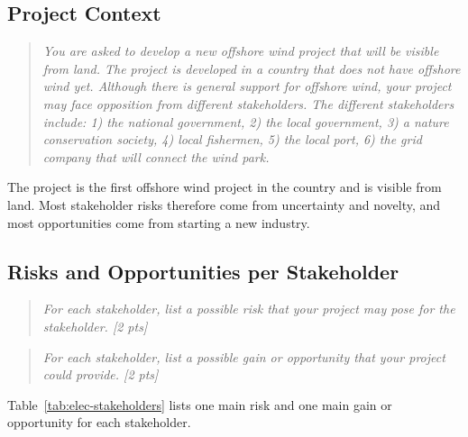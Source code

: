 \subsection{Project Context}
\label{sec:elec-context}
\begin{quote}
\emph{You are asked to develop a new offshore wind project that will be visible from land. The project is developed in a country that does not have offshore wind yet. Although there is general support for offshore wind, your project may face opposition from different stakeholders. The different stakeholders include: 1) the national government, 2) the local government, 3) a nature conservation society, 4) local fishermen, 5) the local port, 6) the grid company that will connect the wind park.}
\end{quote}

The project is the first offshore wind project in the country and is visible from land. Most stakeholder risks therefore come from uncertainty and novelty, and most opportunities come from starting a new industry.

\subsection{Risks and Opportunities per Stakeholder}
\label{sec:elec-stakeholders}
\begin{quote}
\emph{For each stakeholder, list a possible risk that your project may pose for the stakeholder. [2 pts]}
\end{quote}
\begin{quote}
\emph{For each stakeholder, list a possible gain or opportunity that your project could provide. [2 pts]}
\end{quote}

Table~\ref{tab:elec-stakeholders} lists one main risk and one main gain or opportunity for each stakeholder.

